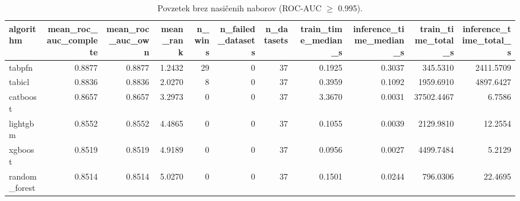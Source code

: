 \begin{table}[htbp]
\centering
\caption{Povzetek brez nasičenih naborov (ROC-AUC $\geq$ 0.995).}
\label{tab:overall-nonsat}
\begin{tabular}{lrrrrrrrrrr}
\hline
algorithm & mean\_roc\_auc\_complete & mean\_roc\_auc\_own & mean\_rank & n\_wins & n\_failed\_datasets & n\_datasets & train\_time\_median\_s & inference\_time\_median\_s & train\_time\_total\_s & inference\_time\_total\_s \\
\hline
tabpfn & 0.8877 & 0.8877 & 1.2432 & 29 & 0 & 37 & 0.1925 & 0.3037 & 345.5310 & 2411.5709 \\
tabicl & 0.8836 & 0.8836 & 2.0270 & 8 & 0 & 37 & 0.3959 & 0.1092 & 1959.6910 & 4897.6427 \\
catboost & 0.8657 & 0.8657 & 3.2973 & 0 & 0 & 37 & 3.3670 & 0.0031 & 37502.4467 & 6.7586 \\
lightgbm & 0.8552 & 0.8552 & 4.4865 & 0 & 0 & 37 & 0.1055 & 0.0039 & 2129.9810 & 12.2554 \\
xgboost & 0.8519 & 0.8519 & 4.9189 & 0 & 0 & 37 & 0.0956 & 0.0027 & 4499.7484 & 5.2129 \\
random\_forest & 0.8514 & 0.8514 & 5.0270 & 0 & 0 & 37 & 0.1501 & 0.0244 & 796.0306 & 22.4695 \\
\hline
\end{tabular}
\end{table}
